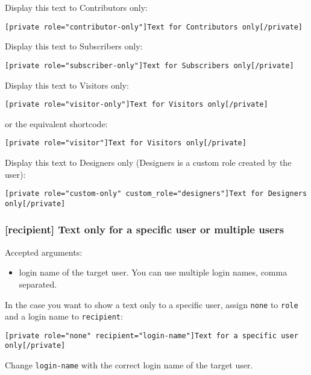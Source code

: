 \documentclass[a4paper,11pt]{article}
\begin{document}
Display this text to Contributors only:

\begin{lstlisting}
[private role="contributor-only"]Text for Contributors only[/private]
\end{lstlisting}

Display this text to Subscribers only:

\begin{lstlisting}
[private role="subscriber-only"]Text for Subscribers only[/private]
\end{lstlisting}

Display this text to Visitors only:

\begin{lstlisting}
[private role="visitor-only"]Text for Visitors only[/private]
\end{lstlisting}

or the equivalent shortcode:

\begin{lstlisting}
[private role="visitor"]Text for Visitors only[/private]
\end{lstlisting}

Display this text to Designers only (Designers is a custom role created by the user):

\begin{lstlisting}
[private role="custom-only" custom_role="designers"]Text for Designers only[/private]
\end{lstlisting}

\subsubsection{[recipient] Text only for a specific user or multiple users}

Accepted arguments:

\begin{itemize}
 \item login name of the target user. You can use multiple login names, comma separated.
\end{itemize}

In the case you want to show a text only to a specific user, assign \verb+none+ to \verb+role+ and a login name to \verb+recipient+:

\begin{lstlisting}
[private role="none" recipient="login-name"]Text for a specific user only[/private]
\end{lstlisting}

Change \verb+login-name+ with the correct login name of the target user.
\end{document}
